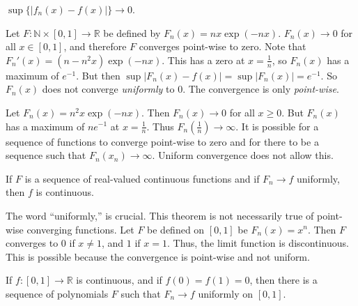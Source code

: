 \documentclass[crop=false,class=book,oneside]{standalone}
\begin{document}
            $\sup\{|f_{n}(x)-f(x)|\}\rightarrow{0}$.
            \begin{example}
                Let
                $F:\mathbb{N}\times[0,1]\rightarrow\mathbb{R}$
                be defined by $F_{n}(x)=nx\exp(-nx)$.
                $F_{n}(x)\rightarrow{0}$ for all $x\in[0,1]$,
                and therefore $F$ converges point-wise to zero.
                Note that $F_{n}'(x)=(n-n^{2}x)\exp(-nx)$.
                This has a zero at $x=\frac{1}{n}$, so
                $F_{n}(x)$ has a maximum of $e^{-1}$. But then
                $\sup|F_{n}(x)-f(x)|=\sup|F_{n}(x)|=e^{-1}$.
                So $F_{n}(x)$ does not converge
                \textit{uniformly} to $0$. The
                convergence is only \textit{point-wise}.
            \end{example}
            \begin{example}
                Let $F_{n}(x)=n^{2}x\exp(-nx)$. Then
                $F_{n}(x)\rightarrow{0}$ for all
                $x\geq{0}$. But $F_{n}(x)$ has
                a maximum of $ne^{-1}$ at $x=\frac{1}{n}$.
                Thus $F_{n}(\frac{1}{n})\rightarrow\infty$.
                It is possible for a sequence
                of functions to converge point-wise to zero
                and for there to be a sequence such that
                $F_{n}(x_{n})\rightarrow\infty$. Uniform
                convergence does not allow this.
            \end{example}
            \begin{theorem}
                If $F$ is a sequence of
                real-valued continuous functions and if
                $F_{n}\rightarrow{f}$ uniformly, then
                $f$ is continuous.
            \end{theorem}
            The word ``uniformly,'' is crucial.
            This theorem is not necessarily true of
            point-wise converging functions. Let $F$ be
            defined on $[0,1]$ be
            $F_{n}(x)=x^{n}$. Then $F$ converges to
            $0$ if $x\ne{1}$, and $1$ if $x=1$. Thus,
            the limit function is discontinuous. This is
            possible because the convergence is
            point-wise and not uniform.
            \begin{theorem}
                    \label{thm:funct:Weak_Weierstrass_%
                           Approx_Theorem}
                    If $f:[0,1]\rightarrow\mathbb{R}$ is continuous,
                    and if $f(0)=f(1)=0$,
                    then there is a sequence of polynomials
                    $F$ such that $F_{n}\rightarrow{f}$
                    uniformly on $[0,1]$.
                \end{theorem}
\end{document}
